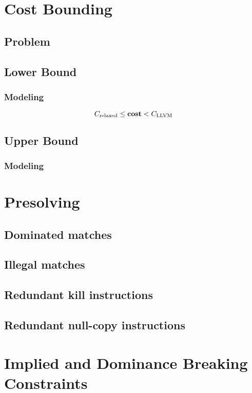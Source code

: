 \section{Cost Bounding}
\subsection{Problem}
\subsection{Lower Bound}
\subsubsection{Modeling}

\begin{equation}
  \mRelaxedCost \leq \mVar{cost} < \mLlvmCost
  \labelEquation{bounds}
\end{equation}

\subsection{Upper Bound}
\subsubsection{Modeling}

\section{Presolving}
\subsection{Dominated matches}
\subsection{Illegal matches}
\subsection{Redundant kill instructions}
\subsection{Redundant null-copy instructions}

\section{Implied and Dominance Breaking Constraints}

